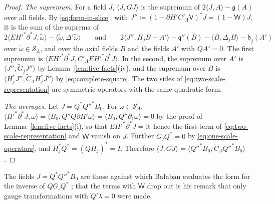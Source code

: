 \documentclass[11pt]{preprint}
\numberwithin{equation}{section}
\theoremstyle{definition}
\theoremstyle{remark}
\theoremstyle{plain}
\begin{document}
\begin{proof}
\emph{The supremum.} For a field $J$, $\langle J, GJ\rangle$ is the supremum of $2\langle J, A\rangle - \mathfrak g(A)$ over all fields. By \eqref{eq:form-in-slice}, with $J'' \coloneqq (1 - \partial H'C'_\Lambda\mathsf V)^*J = (1 - \mathsf W)J$, it is the sum of the suprema of
\begin{equation}\label{eq:two-suprema}
    2\langle EH'^*\partial^*J, \tilde\omega\rangle - \langle\tilde\omega, \Delta'\tilde\omega\rangle
    \qquad\text{and}\qquad
    2\langle J'', H_jB + A'\rangle - \mathfrak q''(B) - \langle B, \Delta_jB\rangle - \mathfrak h_j(A')
\end{equation}
over $\tilde\omega \in \mathcal S_\Lambda$, and over the axial fields $B$ and the fields $A'$ with $QA' = 0$. The first supremum is $\langle EH'^*\partial^*J, C'_\Lambda EH'^*\partial^*J\rangle$. In the second, the supremum over $A'$ is $\langle J'', \tilde G_jJ''\rangle$ by Lemma~\ref{lem:five-facts}(iv), and the supremum over $B$ is $\langle H_j^*J'', \tilde C_\Lambda H_j^*J''\rangle$ by \eqref{eq:complete-square}. The two sides of \eqref{eq:two-scale-representation} are symmetric operators with the same quadratic form.

\emph{The averages.} Let $J = Q^*Q''^*B_0$. For $\omega \in \mathcal S_\Lambda$, $\langle H'^*\partial^*J, \omega\rangle = \langle B_0, Q''Q\partial H'\omega\rangle = \langle B_0, Q''\partial_1\omega\rangle = 0$ by the proof of Lemma~\ref{lem:five-facts}(i), so that $EH'^*\partial^*J = 0$; hence the first term of \eqref{eq:two-scale-representation} and $\mathsf W$ vanish on $J$. Further $\tilde G_jQ^* = 0$ by \eqref{eq:one-scale-operators}, and $H_j^*Q^* = (QH_j)^* = I$. Therefore $\langle J, GJ\rangle = \langle Q''^*B_0, \tilde C_\Lambda Q''^*B_0\rangle$.
\end{proof}

The fields $J = Q^*Q''^*B_0$ are those against which Ba{\l}aban evaluates the form for the inverse of $QG_\square Q^*$ \cite[(2.144)--(2.146)]{BalabanPRT2}; that the terms with $\mathsf W$ drop out is his remark that only gauge transformations with $Q'\lambda = 0$ were made.
\end{document}
